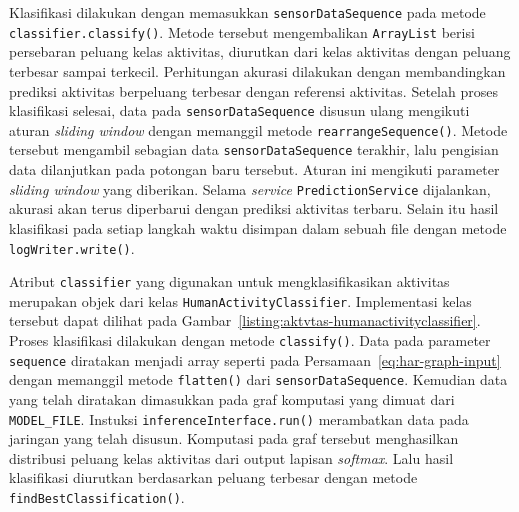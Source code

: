 Klasifikasi dilakukan dengan memasukkan \texttt{sensorDataSequence} pada metode \texttt{classifier.classify()}. Metode tersebut mengembalikan \texttt{ArrayList} berisi persebaran peluang kelas aktivitas, diurutkan dari kelas aktivitas dengan peluang terbesar sampai terkecil. Perhitungan akurasi dilakukan dengan membandingkan prediksi aktivitas berpeluang terbesar dengan referensi aktivitas. Setelah proses klasifikasi selesai, data pada \texttt{sensorDataSequence} disusun ulang mengikuti aturan \textit{sliding window} dengan memanggil metode \texttt{rearrangeSequence()}. Metode tersebut mengambil sebagian data \texttt{sensorDataSequence} terakhir, lalu pengisian data dilanjutkan pada potongan baru tersebut. Aturan ini mengikuti parameter \textit{sliding window} yang diberikan. Selama \textit{service} \texttt{PredictionService} dijalankan, akurasi akan terus diperbarui dengan prediksi aktivitas terbaru. Selain itu hasil klasifikasi pada setiap langkah waktu disimpan dalam sebuah file dengan metode \texttt{logWriter.write()}.

Atribut \texttt{classifier} yang digunakan untuk mengklasifikasikan aktivitas merupakan objek dari kelas \texttt{HumanActivityClassifier}. Implementasi kelas tersebut dapat dilihat pada Gambar~\ref{listing:aktvtas-humanactivityclassifier}. Proses klasifikasi dilakukan dengan metode \texttt{classify()}. Data pada parameter \texttt{sequence} diratakan menjadi array seperti pada Persamaan~\ref{eq:har-graph-input} dengan memanggil metode \texttt{flatten()} dari \texttt{sensorDataSequence}. Kemudian data yang telah diratakan dimasukkan pada graf komputasi yang dimuat dari \texttt{MODEL_FILE}. Instuksi \texttt{inferenceInterface.run()} merambatkan data pada jaringan yang telah disusun. Komputasi pada graf tersebut menghasilkan distribusi peluang kelas aktivitas dari output lapisan \textit{softmax}. Lalu hasil klasifikasi diurutkan berdasarkan peluang terbesar dengan metode \texttt{findBestClassification()}.

